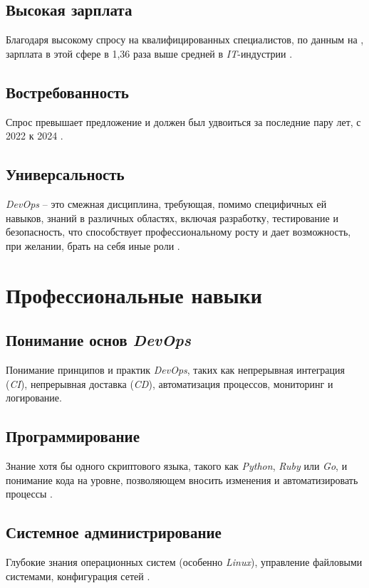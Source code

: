 \documentclass[variant=practice]{bsuir}
\begin{document}
\subsection{Высокая зарплата} Благодаря высокому спросу на квалифицированных
специалистов, по данным на  \cite{devops-habr}, зарплата
в этой сфере в 1,36 раза выше средней в \textit{IT}-индустрии \cite{devops-mts}.

\subsection{Востребованность} Спрос превышает предложение и должен был удвоиться
за последние пару лет, с 2022 к 2024 \cite{devops-mts}.

\subsection{Универсальность} \textit{DevOps} -- это смежная дисциплина,
требующая, помимо специфичных ей навыков, знаний в различных областях, включая
разработку, тестирование и безопасность, что способствует профессиональному
росту и дает возможность, при желании, брать на себя иные роли
\cite{devops-mts}.

\section{Профессиональные навыки}

\subsection{Понимание основ \textit{DevOps}} Понимание принципов и практик
\textit{DevOps}, таких как непрерывная интеграция (\textit{CI}), непрерывная
доставка (\textit{CD}), автоматизация процессов, мониторинг и логирование.

\subsection{Программирование} Знание хотя бы одного скриптового языка, такого
как \textit{Python}, \textit{Ruby} или \textit{Go}, и понимание кода на
уровне, позволяющем вносить изменения и автоматизировать процессы
\cite{devops-mts}.

\subsection{Системное администрирование} Глубокие знания операционных систем
(особенно \textit{Linux}), управление файловыми системами, конфигурация сетей
\cite{devops-mts}.
\end{document}
